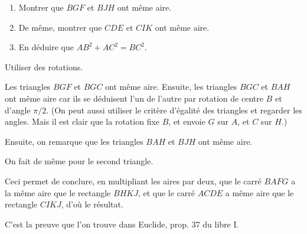 \begin{exo}
\begin{center}
\end{center}
\begin{enumerate}
\item Montrer que $BGF$ et $BJH$ ont même aire.
\item De même, montrer que $CDE$ et $CIK$ ont même aire.
\item En déduire que $AB^2+AC^2=BC^2$.
\end{enumerate}
\begin{hint}
Utiliser des rotations.
\end{hint}
\begin{sol}
Les triangles $BGF$ et $BGC$ ont même aire. Ensuite, les triangles $BGC$ et $BAH$ ont même aire car ils se déduisent l'un de l'autre par rotation de centre $B$ et d'angle $\pi/2$. (On peut aussi utiliser le critère d'égalité des triangles et regarder les angles. Mais il est clair que la rotation fixe $B$, et envoie $G$ sur $A$, et $C$ sur $H$.)

Ensuite, on remarque que les triangles $BAH$ et $BJH$ ont même aire.

On fait de même pour le second triangle.

Ceci permet de conclure, en multipliant les aires par deux,  que le carré $BAFG$ a la même aire que le rectangle $BHKJ$, et que le carré $ACDE$ a même aire que le rectangle $CIKJ$, d'où le résultat.

C'est la preuve que l'on trouve dans Euclide, prop. 37 du libre I.
\end{sol}
\end{exo}



